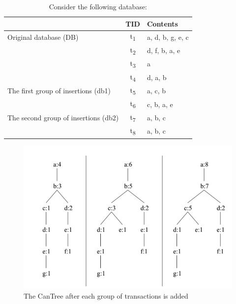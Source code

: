 \begin{table}[h!]
  \begin{center}
    \caption{Consider the following database:}
    \label{tab:table1}
    \begin{tabular}{l|c|l} %
      \textbf{} & \textbf{TID} & \textbf{Contents}\\
      \hline
      Original database (DB) & t\textsubscript{1} & {a, d, b, g, e, c}\\
       & t\textsubscript{2} & {d, f, b, a, e}\\
        & t\textsubscript{3} & {a}\\
	   & t\textsubscript{4} & {d, a, b}\\
       The first group of insertions (db1) & t\textsubscript{5} & {a, c, b}\\
        & t\textsubscript{6} & {c, b, a, e}\\
       The second group of insertions (db2) & t\textsubscript{7} & {a, b, c}\\
        & t\textsubscript{8} & {a, b, c} \\
    \end{tabular}
  \end{center}
\end{table}



\begin{figure}
  \centering
  \includegraphics[width=\linewidth]{figures/CanTreeExample}
  \caption{The CanTree after each group of transactions is added}
  \label{fig:CanTreeExample}
\end{figure}



